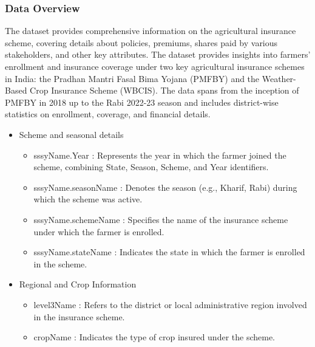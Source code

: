 \documentclass[12pt]{article}
\begin{document}
\subsubsection{Data Overview}
The dataset provides comprehensive information on the agricultural insurance scheme, covering details about policies, premiums, shares paid by various stakeholders,
 and other key attributes. The dataset provides insights into farmers' enrollment and insurance coverage under two key agricultural insurance schemes in India: the 
Pradhan Mantri Fasal Bima Yojana (PMFBY) and the Weather-Based Crop Insurance Scheme (WBCIS). The data spans from the inception of PMFBY in 2018 up to the Rabi 2022-23 season 
and includes district-wise statistics on enrollment, coverage, and financial details.
\vspace{5pt}
\begin{itemize}
\item {Scheme and seasonal details}
\begin{itemize}
\item{sssyName.Year : Represents the year in which the farmer joined the scheme, combining State, Season, Scheme, and Year identifiers.}
\item{sssyName.seasonName : Denotes the season (e.g., Kharif, Rabi) during which the scheme was active.}
\item{sssyName.schemeName : Specifies the name of the insurance scheme under which the farmer is enrolled.}
\item{sssyName.stateName : Indicates the state in which the farmer is enrolled in the scheme.}
\end{itemize}
\end{itemize}


\begin{itemize}
\item {Regional and Crop Information}
\begin{itemize}
\item{level3Name : Refers to the district or local administrative region involved in the insurance scheme.}
\item{cropName : Indicates the type of crop insured under the scheme.}
\end{itemize}
\end{itemize}


\end{document}
